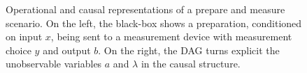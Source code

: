 \documentclass[a4paper,preprintnumbers,floatfix,superscriptaddress,pra,twocolumn,showpacs,notitlepage,longbibliography]{revtex4-2}
\begin{document}
    \begin{figure}
        \centering
        \hspace{3.5em}
        \caption{Operational and causal representations of a prepare and measure scenario. On the left, the black-box shows a preparation, conditioned on input $x$, being sent to a measurement device with measurement choice $y$ and output $b$. On the right, the DAG turns explicit the unobservable variables $a$ and $\lambda$ in the causal structure.}
    \end{figure}
\end{document}
